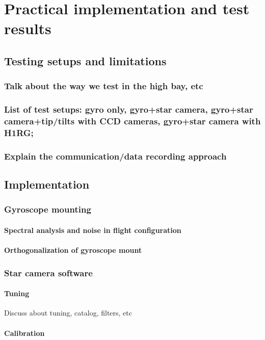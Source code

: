 \section{Practical implementation and test results}


\subsection{Testing setups and limitations}
\subsubsection{Talk about the way we test in the high bay, etc}
\subsubsection{List of test setups: gyro only, gyro+star camera, gyro+star camera+tip/tilts with CCD cameras, gyro+star camera with H1RG;}
\subsubsection{Explain the communication/data recording approach}
\subsection{Implementation}
\subsubsection{Gyroscope mounting}
\paragraph{Spectral analysis and noise in flight configuration}
\paragraph{Orthogonalization of gyroscope mount}



\subsubsection{Star camera software}
\paragraph{Tuning}
Discuss about tuning, catalog, filters, etc
\paragraph{Calibration}

